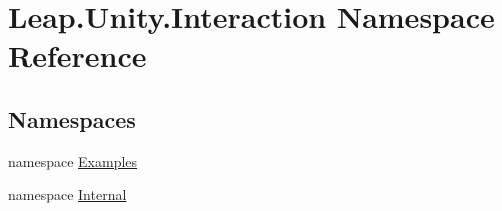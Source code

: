 \hypertarget{namespace_leap_1_1_unity_1_1_interaction}{}\section{Leap.\+Unity.\+Interaction Namespace Reference}
\label{namespace_leap_1_1_unity_1_1_interaction}
\subsection*{Namespaces}
\begin{DoxyCompactItemize}
\item 
namespace \mbox{\hyperlink{namespace_leap_1_1_unity_1_1_interaction_1_1_examples}{Examples}}
\item 
namespace \mbox{\hyperlink{namespace_leap_1_1_unity_1_1_interaction_1_1_internal}{Internal}}
\end{DoxyCompactItemize}
